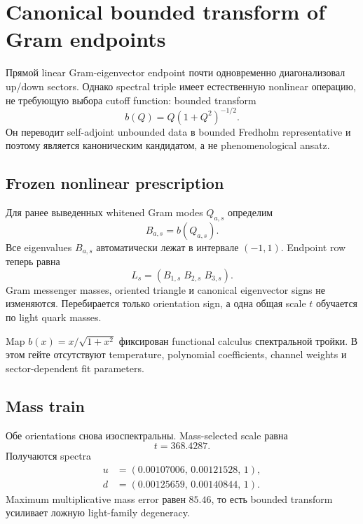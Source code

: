 \chapter{Canonical bounded transform of Gram endpoints}

Прямой linear Gram-eigenvector endpoint почти одновременно диагонализовал
up/down sectors. Однако spectral triple имеет естественную nonlinear
операцию, не требующую выбора cutoff function: bounded transform
\begin{equation}
 b(Q)=Q(1+Q^2)^{-1/2}.
\end{equation}
Он переводит self-adjoint unbounded data в bounded Fredholm representative и
поэтому является каноническим кандидатом, а не phenomenological ansatz.

\section{Frozen nonlinear prescription}

Для ранее выведенных whitened Gram modes $Q_{a,s}$ определим
\begin{equation}
 B_{a,s}=b(Q_{a,s}).
\end{equation}
Все eigenvalues $B_{a,s}$ автоматически лежат в интервале $(-1,1)$. Endpoint
row теперь равна
\begin{equation}
 L_s=(B_{1,s}\;B_{2,s}\;B_{3,s}).
\end{equation}
Gram messenger masses, oriented triangle и canonical eigenvector signs не
изменяются. Перебирается только orientation sign, а одна общая scale $t$
обучается по light quark masses.

\begin{proposition}
Map $b(x)=x/\sqrt{1+x^2}$ фиксирован functional calculus спектральной тройки.
В этом гейте отсутствуют temperature, polynomial coefficients, channel
weights и sector-dependent fit parameters.
\end{proposition}

\section{Mass train}

Обе orientations снова изоспектральны. Mass-selected scale равна
\begin{equation}
 t=368.4287.
\end{equation}
Получаются spectra
\begin{align}
 u&=(0.00107006,\,0.00121528,\,1),\\
 d&=(0.00125659,\,0.00140844,\,1).
\end{align}
Maximum multiplicative mass error равен $85.46$, то есть bounded transform
усиливает ложную light-family degeneracy.

